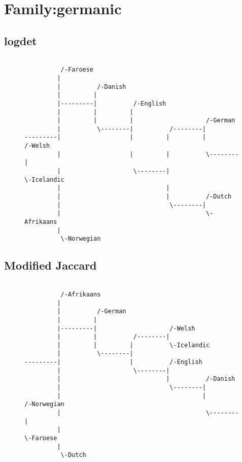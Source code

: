 \section{Family:germanic}
\subsection{logdet}
\begin{figure}[!htb]
\begin{center}
{
\selectfont
\begin{verbatim}

          /-Faroese
         |
         |          /-Danish
         |         |
         |---------|          /-English
         |         |         |
         |         |         |                    /-German
         |          \--------|          /--------|
---------|                   |         |         |          /-Welsh
         |                   |         |          \--------|
         |                    \--------|                    \-Icelandic
         |                             |
         |                             |          /-Dutch
         |                              \--------|
         |                                        \-Afrikaans
         |
          \-Norwegian

\end{verbatim}
}
\label{...}
\end{center}
\end{figure}
\subsection{Modified Jaccard}
\begin{figure}[!htb]
\begin{center}
{
\selectfont
\begin{verbatim}

          /-Afrikaans
         |
         |          /-German
         |         |
         |---------|                    /-Welsh
         |         |          /--------|
         |         |         |          \-Icelandic
         |          \--------|
---------|                   |          /-English
         |                    \--------|
         |                             |          /-Danish
         |                              \--------|
         |                                       |          /-Norwegian
         |                                        \--------|
         |                                                  \-Faroese
         |
          \-Dutch

\end{verbatim}
}
\label{...}
\end{center}
\end{figure}
